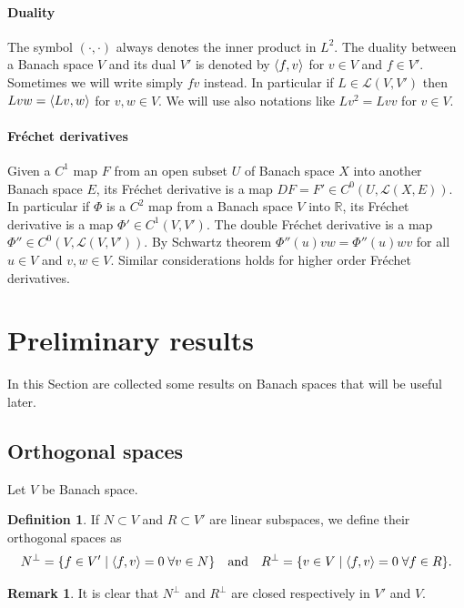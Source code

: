 \documentclass[a4paper,11pt]{article}
\theoremstyle{definition}
\newtheorem{defi}[prop]{Definition}
\newtheorem{rmk}[prop]{Remark}
\DeclarePairedDelimiter{\dual}{\langle}{\rangle}
\begin{document}
\paragraph{Duality} The symbol $(\cdot,\cdot)$ always denotes the inner product in $L^2$. The duality between a Banach space $V$ and its dual $V'$ is denoted by $\dual{f,v}$ for $v\in V$ and $f\in V'$. Sometimes we will write simply $fv$ instead. In particular if $L\in\mathscr{L}(V,V')$ then $Lvw=\dual{Lv,w}$ for $v,w\in V$. We will use also notations like $Lv^2=Lvv$ for $v\in V$.

\paragraph{Fréchet derivatives} Given a $C^1$ map $F$ from an open subset $U$ of Banach space $X$ into another Banach space $E$, its Fréchet derivative is a map $DF=F'\in C^0(U,\mathscr{L}(X,E))$. In particular if $\Phi$ is a $C^2$ map from a Banach space $V$ into $\mathbb{R}$, its Fréchet derivative is a map $\Phi'\in C^1(V,V')$. The double Fréchet derivative is a map $\Phi''\in C^0(V,\mathscr{L}(V,V'))$. By Schwartz theorem $\Phi''(u)vw=\Phi''(u)wv$ for all $u\in V$ and $v,w\in V$. Similar considerations holds for higher order Fréchet derivatives.

\section{Preliminary results}
\label{sec:preliminary}

In this Section are collected some results on Banach spaces that will be useful later.

\subsection{Orthogonal spaces}

Let $V$ be Banach space.

\begin{defi}
If $N\subset V$ and $R\subset V'$ are linear subspaces, we define their orthogonal spaces as
\[
N^\perp=\{f\in V'\;|\;\dual{f,v}=0\;\forall v\in N\}
\quad\text{and}\quad
R^\perp=\{v\in V\;|\;\dual{f,v}=0\;\forall f\in R\}.
\]
\end{defi}
\begin{rmk}
It is clear that $N^\perp$ and $R^\perp$ are closed respectively in $V'$ and $V$.
\end{rmk}
\end{document}

